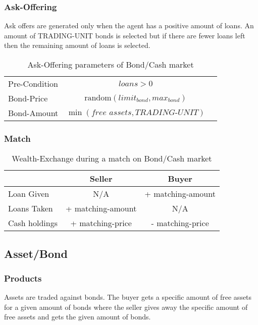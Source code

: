 \documentclass[Bachelorarbeit.tex]{subfiles}
\begin{document}
\subsubsection{Ask-Offering}
Ask offers are generated only when the agent has a positive amount of loans. An amount of TRADING-UNIT bonds is selected but if there are fewer loans left then the remaining amount of loans is selected.

\begin{table}[H]
	\centering
	\caption{Ask-Offering parameters of Bond/Cash market}
	\begin{tabular} { l c r }
		\hline
		Pre-Condition & $\textit{loans} > 0$  \\
		Bond-Price & $\mathrm{random}(limit_{bond}, max_{bond})$ \\
		Bond-Amount & $\min ({\textit{free assets} }, \textit{TRADING-UNIT} )$ \\
		\hline
	\end{tabular}
\end{table}

\subsubsection{Match}

\begin{table}[H]
	\centering
	\caption{Wealth-Exchange during a match on Bond/Cash market}
	\begin{tabular} { l c c }
		& Seller & Buyer \\
		\hline
		Loan Given & N/A & + matching-amount \\
		Loans Taken & + matching-amount & N/A \\
		Cash holdings & + matching-price & - matching-price \\
		\hline
	\end{tabular}
\end{table}

\subsection{Asset/Bond}
\label{sec:ASSET_BOND_MARKET}
\subsubsection{Products}
Assets are traded against bonds. The buyer gets a specific amount of free assets for a given amount of bonds where the seller gives away the specific amount of free assets and gets the given amount of bonds.
\end{document}
